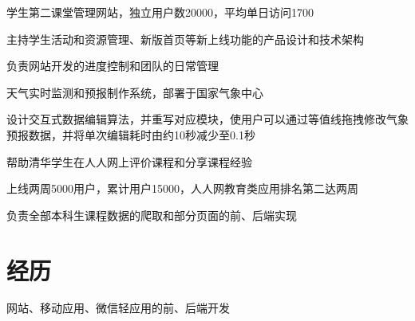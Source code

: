 \documentclass[a4paper]{rukh-cv-zh}
\begin{document}
\begin{minipage}[t]{0.74\textwidth}
\sectionspace


\begin{tightitemize}
\item 学生第二课堂管理网站，独立用户数20000，平均单日访问1700
\item 主持学生活动和资源管理、新版首页等新上线功能的产品设计和技术架构
\item 负责网站开发的进度控制和团队的日常管理
\end{tightitemize}

\sectionspace


\begin{tightitemize}
\item 天气实时监测和预报制作系统，部署于国家气象中心
\item 设计交互式数据编辑算法，并重写对应模块，使用户可以通过等值线拖拽修改气象预报数据，并将单次编辑耗时由约10秒减少至0.1秒
\end{tightitemize}

\sectionspace


\begin{tightitemize}
\item 帮助清华学生在人人网上评价课程和分享课程经验
\item 上线两周5000用户，累计用户15000，人人网教育类应用排名第二达两周
\item 负责全部本科生课程数据的爬取和部分页面的前、后端实现
\end{tightitemize}

\sectionspace


\section{经历}

\begin{tightitemize}
\item 网站、移动应用、微信轻应用的前、后端开发
\end{tightitemize}


\end{minipage}
\end{document}
